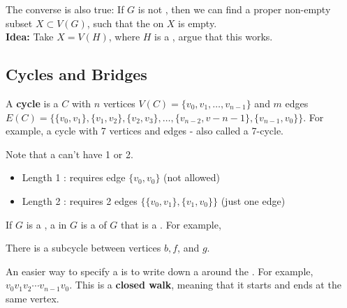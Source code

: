 \documentclass[english, 11pt]{article}
\begin{document}
The converse is also true: If $G$ is not , then we can find a proper non-empty subset $X \subset V(G)$, such that the  on $X$ is empty. \\

\textbf{Idea:} Take $X = V(H)$, where $H$ is a , argue that this works.

\subsection{Cycles and Bridges}

\begin{defn}[cycle]\label{cycle}
A \textbf{cycle} is a  $C$ with $n$ vertices $V(C) = \{v_0, v_1, \ldots, v_{n-1}\}$ and $m$ edges $E(C) = \{ \{v_0, v_1\}, \{v_1, v_2\}, \{v_2,v_3\}, \ldots, \{v_{n-2}, v-{n-1}\}, \{v_{n-1}, v_0\}\}$. For example, a cycle with 7 vertices and edges - also called a 7-cycle.
  \begin{center}
\end{center}
Note that a  can't have  1 or 2.
\begin{itemize}
  \item Length 1 : requires edge $\{v_0, v_0\}$ (not allowed)
  \item Length 2 : requires 2 edges $\{\{v_0,v_1\},\{v_1,v_0\}\}$ (just one edge)
\end{itemize}
\end{defn}
\begin{defn}[subcycle]\label{subcycle}
If $G$ is a , a  in $G$ is a  of $G$ that is a . For example,
 \begin{center}
\end{center}
There is a subcycle between vertices $b, f$, and $g$.
\end{defn}
An easier way to specify a  is to write down a  around the . For example, $v_0v_1v_2\cdots v_{n-1}v_0$. This is a \textbf{closed walk}, meaning that it starts and ends at the same vertex. \\
\end{document}
